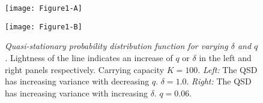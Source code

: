 
\iffalse
\begin{figure}[h]
	\centering
	\subfloat[\emph{Probability distribution with $\delta=1.00$ and $K=100$}]{\texttt{[image: Figure1-A]}\label{qsd:q}}
	\hfill
	\subfloat[\emph{Probability distribution with $q=0.06$ and $K=100$}]{\texttt{[image: Figure1-B]}\label{qsd:delta}}
	\caption{\emph{Probability distribution of the population} The conditional probability distribution functions as found using the quasi-stationary distribution algorithm. Note that for each curve, the population cutoff $N$ is outside the domain presented here. In \ref{qsd:q} increasing lightness indicates an increase in $q$. Similarly, the lightness increase in \ref{qsd:delta} corresponds to an increase in $\delta$}
	\label{qsd}
\end{figure}%
\fi
\begin{figure}[h]
	\centering
	\begin{minipage}{0.49\linewidth}
		\centering
		\texttt{[image: Figure1-A]}
	\end{minipage}
	\begin{minipage}{0.49\linewidth}
		\centering
		\texttt{[image: Figure1-B]}
	\end{minipage}
	\caption{\emph{Quasi-stationary probability distribution function for varying $\delta$ and $q$.} Lightness of the line indicates an increase of $q$ or $\delta$ in the left and right panels respectively. Carrying capacity $K=100$. 
	\emph{Left:} The QSD has increasing variance with decreasing $q$. $\delta=1.0$. 
	\emph{Right:} The QSD has increasing variance with increasing $\delta$. $q=0.06$. 
	}
	\label{qsd}
\end{figure}%


